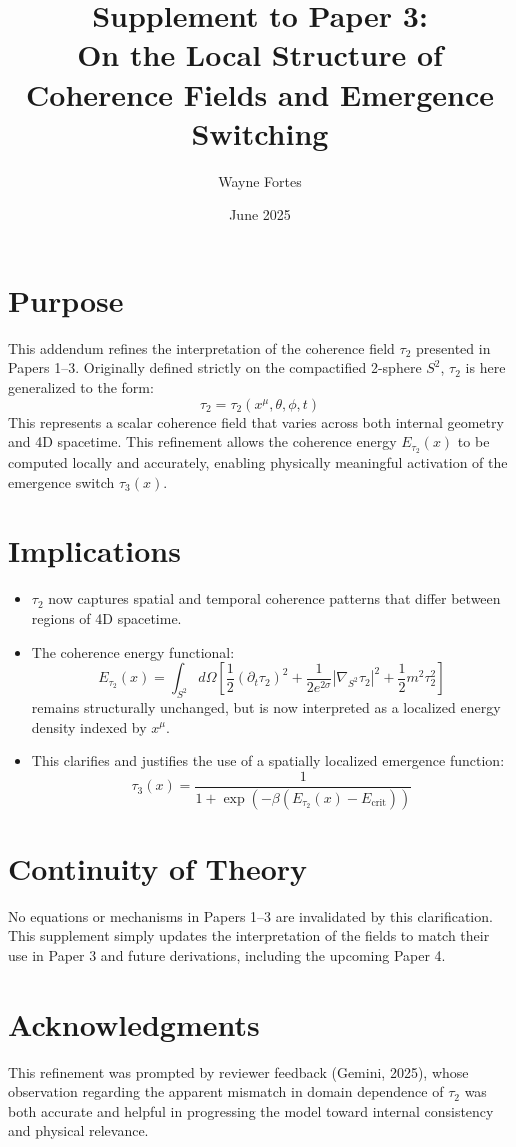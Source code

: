 \documentclass[12pt]{article}
\title{Supplement to Paper 3:\\On the Local Structure of Coherence Fields and Emergence Switching}
\author{Wayne Fortes}
\date{June 2025}
\begin{document}
\maketitle

\section*{Purpose}

This addendum refines the interpretation of the coherence field $\tau_2$ presented in Papers 1--3. Originally defined strictly on the compactified 2-sphere $S^2$, $\tau_2$ is here generalized to the form:
\[
\tau_2 = \tau_2(x^\mu, \theta, \phi, t)
\]
This represents a scalar coherence field that varies across both internal geometry and 4D spacetime. This refinement allows the coherence energy $E_{\tau_2}(x)$ to be computed locally and accurately, enabling physically meaningful activation of the emergence switch $\tau_3(x)$.

\section*{Implications}

\begin{itemize}
    \item $\tau_2$ now captures spatial and temporal coherence patterns that differ between regions of 4D spacetime.
    \item The coherence energy functional:
    \[
    E_{\tau_2}(x) = \int_{S^2} d\Omega \left[ \frac{1}{2}(\partial_t \tau_2)^2 + \frac{1}{2e^{2\sigma}} |\nabla_{S^2} \tau_2|^2 + \frac{1}{2} m^2 \tau_2^2 \right]
    \]
    remains structurally unchanged, but is now interpreted as a localized energy density indexed by $x^\mu$.
    \item This clarifies and justifies the use of a spatially localized emergence function:
    \[
    \tau_3(x) = \frac{1}{1 + \exp(-\beta (E_{\tau_2}(x) - E_{\text{crit}}))}
    \]
\end{itemize}

\section*{Continuity of Theory}

No equations or mechanisms in Papers 1--3 are invalidated by this clarification. This supplement simply updates the interpretation of the fields to match their use in Paper 3 and future derivations, including the upcoming Paper 4.

\section*{Acknowledgments}

This refinement was prompted by reviewer feedback (Gemini, 2025), whose observation regarding the apparent mismatch in domain dependence of $\tau_2$ was both accurate and helpful in progressing the model toward internal consistency and physical relevance.
\end{document}
